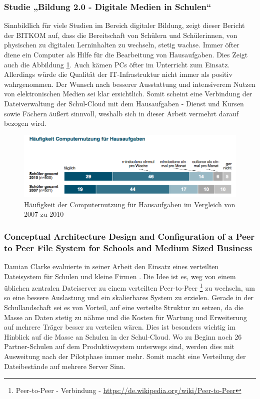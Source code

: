 \subsubsection{Studie „Bildung 2.0 - Digitale Medien in Schulen“}

Sinnbildlich für viele Studien im Bereich digitaler Bildung, zeigt dieser Bericht der BITKOM \cite{paper:studiebildung20} auf, dass die Bereitschaft von Schülern und Schülerinnen, von physischen zu digitalen Lerninhalten zu wechseln, stetig wachse. Immer öfter diene ein Computer als Hilfe für die Bearbeitung von Hausaufgaben. Dies Zeigt auch die Abbildung \ref{fig:BitkomNutzungComputerStudie}. Auch kämen PCs öfter im Unterricht zum Einsatz. Allerdings würde die Qualität der IT-Infrastruktur nicht immer als positiv wahrgenommen. Der Wunsch nach besserer Ausstattung und intensiverem Nutzen von elektronischen Medien sei klar ersichtlich. Somit scheint eine Verbindung der Dateiverwaltung der Schul-Cloud mit dem Hausaufgaben - Dienst und Kursen sowie Fächern äußert sinnvoll, weshalb sich in dieser Arbeit vermehrt darauf bezogen wird.

\begin{figure}[H]
	\centering
	\includegraphics[width=0.8\linewidth]{images/BitkomNutzungComputerStudie}
	\caption[Caption for relatedWork]{Häufigkeit der Computernutzung für Hausaufgaben im Vergleich von 2007 zu 2010\footnotemark}
	\label{fig:BitkomNutzungComputerStudie}
\end{figure}

\subsubsection{Conceptual Architecture Design and Configuration of a Peer to Peer File System for Schools and Medium Sized Business}

Damian Clarke evaluierte in seiner Arbeit den Einsatz eines verteilten Dateisystem für Schulen und kleine Firmen \cite{paper:p2pfilesystemclarke}. Die Idee ist es, weg von einem üblichen zentralen Dateiserver zu einem verteilten Peer-to-Peer \footnote{Peer-to-Peer - Verbindung - \url{https://de.wikipedia.org/wiki/Peer-to-Peer}} zu wechseln, um so eine bessere Auslastung und ein skalierbares System zu erzielen. Gerade in der Schullandschaft sei es von Vorteil, auf eine verteilte Struktur zu setzen, da die Masse an Daten stetig zu nähme und die Kosten für Wartung und Erweiterung auf mehrere Träger besser zu verteilen wären. Dies ist besonders wichtig im Hinblick auf die Masse an Schulen in der Schul-Cloud. Wo zu Beginn noch 26 Partner-Schulen auf dem Produktivsystem unterwegs sind, werden dies mit Ausweitung nach der Pilotphase immer mehr. Somit macht eine Verteilung der Dateibestände auf mehrere Server Sinn.

